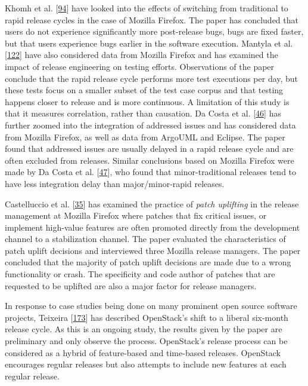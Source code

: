 \documentclass[]{book}
\begin{document}
Khomh et al. {[}\protect\hyperlink{ref-khomh2015a}{94}{]} have looked
into the effects of switching from traditional to rapid release cycles
in the case of Mozilla Firefox. The paper has concluded that users do
not experience significantly more post-release bugs, bugs are fixed
faster, but that users experience bugs earlier in the software
execution. Mantyla et al.
{[}\protect\hyperlink{ref-mantyla2015a}{122}{]} have also considered
data from Mozilla Firefox and has examined the impact of release
engineering on testing efforts. Observations of the paper conclude that
the rapid release cycle performs more test executions per day, but these
tests focus on a smaller subset of the test case corpus and that testing
happens closer to release and is more continuous. A limitation of this
study is that it measures correlation, rather than causation. Da Costa
et al. {[}\protect\hyperlink{ref-da2014a}{46}{]} has further zoomed into
the integration of addressed issues and has considered data from Mozilla
Firefox, as well as data from ArgoUML and Eclipse. The paper found that
addressed issues are usually delayed in a rapid release cycle and are
often excluded from releases. Similar conclusions based on Mozilla
Firefox were made by Da Costa et al.
{[}\protect\hyperlink{ref-da2016a}{47}{]}, who found that
minor-traditional releases tend to have less integration delay than
major/minor-rapid releases.

Castelluccio et al. {[}\protect\hyperlink{ref-castelluccio2017a}{35}{]}
has examined the practice of \emph{patch uplifting} in the release
management at Mozilla Firefox where patches that fix critical issues, or
implement high-value features are often promoted directly from the
development channel to a stabilization channel. The paper evaluated the
characteristics of patch uplift decisions and interviewed three Mozilla
release managers. The paper concluded that the majority of patch uplift
decisions are made due to a wrong functionality or crash. The
specificity and code author of patches that are requested to be uplifted
are also a major factor for release managers.

In response to case studies being done on many prominent open source
software projects, Teixeira
{[}\protect\hyperlink{ref-teixeira2017a}{173}{]} has described
OpenStack's shift to a liberal six-month release cycle. As this is an
ongoing study, the results given by the paper are preliminary and only
observe the process. OpenStack's release process can be considered as a
hybrid of feature-based and time-based releases. OpenStack encourages
regular releases but also attempts to include new features at each
regular release.
\end{document}
